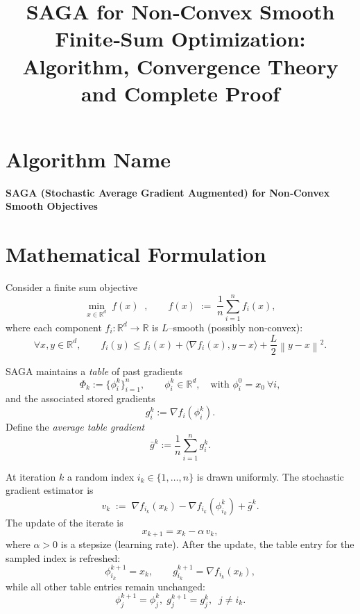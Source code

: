 \documentclass{article}
\newcommand{\RR}{\mathbb{R}}
\newcommand{\norm}[1]{\left\|#1\right\|}
\newcommand{\inner}[2]{\langle #1,#2\rangle}
\begin{document}
\title{SAGA for Non‑Convex Smooth Finite‑Sum Optimization:\\ Algorithm, Convergence Theory and Complete Proof}
\author{}
\date{}
\maketitle

\section*{Algorithm Name}
\textbf{SAGA (Stochastic Average Gradient Augmented) for Non‑Convex Smooth Objectives}
\section*{Mathematical Formulation}
Consider a finite sum objective
\[
\min_{x\in\RR^{d}} \; f(x)\;\;,\qquad 
f(x)\;:=\;\frac{1}{n}\sum_{i=1}^{n} f_i(x),
\]
where each component $f_i:\RR^{d}\to\RR$ is $L$–smooth (possibly non‑convex):
\begin{equation}
\forall x,y\in\RR^{d},\qquad 
f_i(y)\le f_i(x)+\inner{\nabla f_i(x)}{y-x}
+\frac{L}{2}\norm{y-x}^{2}. \tag{1}
\end{equation}

SAGA maintains a \emph{table} of past gradients
\[
\Phi_k:=\{\phi_i^{k}\}_{i=1}^{n},\qquad
\phi_i^{k}\in\RR^{d},\quad 
\text{with } \phi_i^{0}=x_{0}\ \forall i,
\]
and the associated stored gradients
\[
g_i^{k}:=\nabla f_i(\phi_i^{k}).
\]
Define the \emph{average table gradient}
\[
\bar{g}^{k}:=\frac{1}{n}\sum_{i=1}^{n} g_i^{k}.
\]

At iteration $k$ a random index $i_k\in\{1,\dots,n\}$ is drawn uniformly.
The stochastic gradient estimator is
\begin{equation}
v_k \;:=\; \nabla f_{i_k}(x_k)-\nabla f_{i_k}(\phi_{i_k}^{k})+ \bar{g}^{k}. \tag{2}
\end{equation}
The update of the iterate is
\begin{equation}
x_{k+1}=x_{k}-\alpha\, v_k, \tag{3}
\end{equation}
where $\alpha>0$ is a stepsize (learning rate).  
After the update, the table entry for the sampled index is refreshed:
\[
\phi_{i_k}^{k+1}=x_k,\qquad 
g_{i_k}^{k+1}= \nabla f_{i_k}(x_k),
\]
while all other table entries remain unchanged:
\[
\phi_{j}^{k+1}= \phi_{j}^{k},\; g_{j}^{k+1}=g_{j}^{k},\;\;j\neq i_k .
\]
\end{document}
